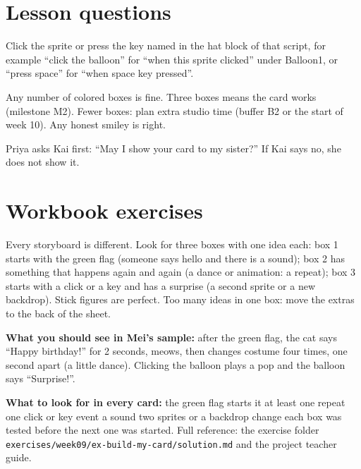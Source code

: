 
\section{Lesson questions}
\begin{answer}
Click the sprite or press the key named in the hat block of that script, for example \enquote{click the balloon} for \enquote{when this sprite clicked} under Balloon1, or \enquote{press space} for \enquote{when space key pressed}.
\end{answer}

\begin{answer}[Reflection]
Any number of colored boxes is fine. Three boxes means the card works (milestone M2). Fewer boxes: plan extra studio time (buffer B2 or the start of week 10). Any honest smiley is right.
\end{answer}

\begin{answer}
Priya asks Kai first: \enquote{May I show your card to my sister?} If Kai says no, she does not show it.
\end{answer}

\section{Workbook exercises}
\begin{answer}
Every storyboard is different. Look for three boxes with one idea each: box 1 starts with the green flag (someone says hello and there is a sound); box 2 has something that happens again and again (a dance or animation: a repeat); box 3 starts with a click or a key and has a surprise (a second sprite or a new backdrop). Stick figures are perfect. Too many ideas in one box: move the extras to the back of the sheet.
\end{answer}

\begin{answer}
\textbf{What you should see in Mei's sample:} after the green flag, the cat says \enquote{Happy birthday!} for 2 seconds, meows, then changes costume four times, one second apart (a little dance). Clicking the balloon plays a pop and the balloon says \enquote{Surprise!}.

\textbf{What to look for in every card:} \tickbox{} the green flag starts it \quad \tickbox{} at least one repeat \quad \tickbox{} one click or key event \quad \tickbox{} a sound \quad \tickbox{} two sprites or a backdrop change \quad \tickbox{} each box was tested before the next one was started. Full reference: the exercise folder \texttt{exercises/week09/ex-build-my-card/solution.md} and the project teacher guide.
\end{answer}

